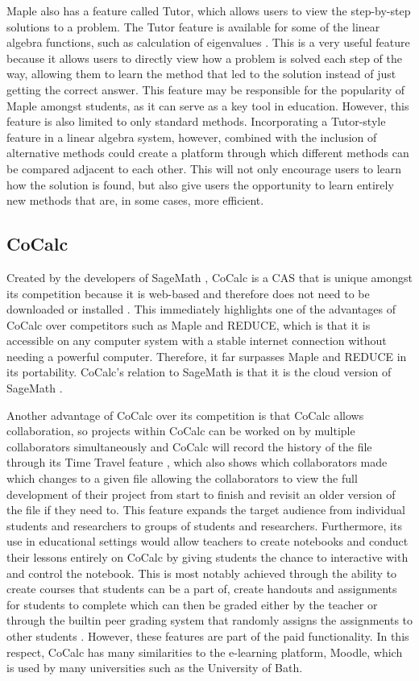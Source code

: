 \documentclass[
]{ceurart}
\begin{document}
Maple also has a feature called Tutor, which allows users to view the step-by-step solutions to a problem. The Tutor feature is available for some of the linear algebra functions, such as calculation of eigenvalues \cite{eigentutor}.  This is a very useful feature because it allows users to directly view how a problem
is solved each step of the way, allowing them to learn the method that led to the solution instead of just
getting the correct answer. This feature may be responsible for the popularity of Maple amongst students,
as it can serve as a key tool in education. However, this feature is also limited to only standard methods.
Incorporating a Tutor-style feature in a linear algebra system, however, combined with the inclusion of
alternative methods could create a platform through which different methods can be compared adjacent
to each other. This will not only encourage users to learn how the solution is found, but also give users
the opportunity to learn entirely new methods that are, in some cases, more efficient.
\subsection{CoCalc}
Created by the developers of SageMath \cite{sagemath}, CoCalc \cite{Stein2018a} is a CAS that is unique amongst its competition because it is web-based and therefore does not need to be downloaded or installed \cite{cocalc}. This immediately highlights one of the advantages of CoCalc over competitors such as Maple and REDUCE, which is that it is accessible on any computer system with a stable internet connection without needing a powerful computer. Therefore, it far surpasses Maple and REDUCE in its portability. CoCalc's relation to SageMath is that it is the cloud version of SageMath \cite{sagebook}.

Another advantage of CoCalc over its competition is that CoCalc allows collaboration, so projects within CoCalc can be worked on by multiple collaborators simultaneously \cite{collab} and CoCalc will record the history of the file through its Time Travel feature \cite{timetravel}, which also shows which collaborators made which changes to a given file allowing the collaborators to view the full development of their project from start to finish and revisit an older version of the file if they need to. This feature expands the target audience from individual students and researchers to groups of students and researchers. Furthermore, its use in educational settings would allow teachers to create notebooks and conduct their lessons entirely on CoCalc by giving students the chance to interactive with and control the notebook. This is most notably achieved through the ability to create courses that students can be a part of, create handouts and assignments for students to complete which can then be graded either by the teacher or through the builtin peer grading system that randomly assigns the assignments to other students \cite{sagebook}. However, these features are part of the paid functionality. In this respect, CoCalc has many similarities to the e-learning platform, Moodle, which is used by many universities such as the University of Bath.
\end{document}
